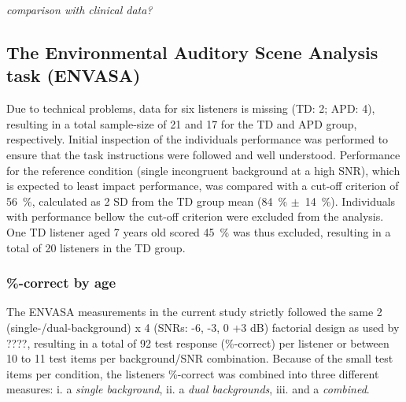 \documentclass[a4paper, twoside]{templates/ociamthesis}
\begin{document}
\colorbox[HTML]{CCCCFF}{\emph{comparison with clinical data?}}

\hypertarget{the-environmental-auditory-scene-analysis-task-envasa-1}{%
\subsection{The Environmental Auditory Scene Analysis task (ENVASA)}\label{the-environmental-auditory-scene-analysis-task-envasa-1}}

Due to technical problems, data for six listeners is missing (TD: 2; APD: 4), resulting in a total sample-size of 21 and 17 for the TD and APD group, respectively. Initial inspection of the individuals performance was performed to ensure that the task instructions were followed and well understood. Performance for the reference condition (single incongruent background at a high SNR), which is expected to least impact performance, was compared with a cut-off criterion of 56~\%, calculated as 2 SD from the TD group mean (84~\% \(\pm\)~14~\%). Individuals with performance bellow the cut-off criterion were excluded from the analysis. One TD listener aged 7 years old scored 45~\% was thus excluded, resulting in a total of 20 listeners in the TD group.

\hypertarget{correct-by-age}{%
\subsubsection*{\%-correct by age}\label{correct-by-age}}

The ENVASA measurements in the current study strictly followed the same 2 (single-/dual-background) x 4 (SNRs: -6, -3, 0 +3 dB) factorial design as used by ????, resulting in a total of 92 test response (\%-correct) per listener or between 10 to 11 test items per background/SNR combination. Because of the small test items per condition, the listeners \%-correct was combined into three different measures: i. a \emph{single background}, ii. a \emph{dual backgrounds}, iii. and a \emph{combined}.
\end{document}
